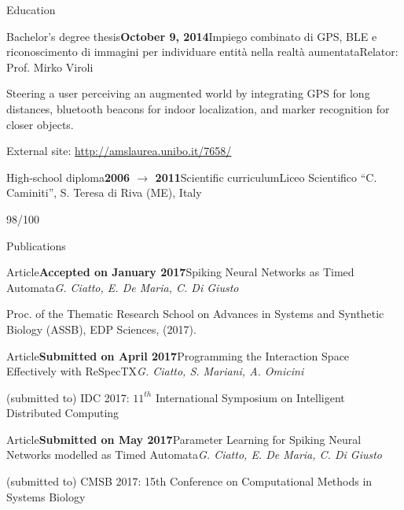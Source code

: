 \documentclass{resume} %
\begin{document}
\begin{rSection}{Education}
\begin{rSubsection}{Bachelor's degree thesis}{\textbf{October 9, 2014}}{Impiego combinato di GPS, BLE e riconoscimento di immagini per individuare entità nella realtà aumentata}{Relator: Prof. Mirko Viroli}
	
	\item Steering a user perceiving an augmented world by integrating GPS for long distances, bluetooth beacons for indoor localization, and marker recognition for closer objects.
	
	\item External site: \url{http://amslaurea.unibo.it/7658/}
\end{rSubsection}

\begin{rSubsection}{High-school diploma}{\textbf{2006 $\rightarrow$ 2011}}{Scientific curriculum}{Liceo Scientifico ``C. Caminiti'', S. Teresa di Riva (ME), Italy}
	\item 98/100
\end{rSubsection}

\end{rSection}

\clearpage


\begin{rSection}{Publications}

\begin{rSubsection}{Article}{\textbf{Accepted on January 2017}}{Spiking Neural Networks as Timed Automata}{\emph{G. Ciatto, E. De Maria, C. Di Giusto}}
	\item Proc. of the Thematic Research School on Advances in Systems and Synthetic Biology (ASSB), EDP Sciences, (2017).
\end{rSubsection}

\begin{rSubsection}{Article}{\textbf{Submitted on April 2017}}{Programming the Interaction Space
		Effectively with ReSpecTX}{\emph{G. Ciatto, S. Mariani, A. Omicini}}
	\item (submitted to) IDC 2017: $11^{th}$ International Symposium on Intelligent Distributed Computing
\end{rSubsection}

\begin{rSubsection}{Article}{\textbf{Submitted on May 2017}}{Parameter Learning for Spiking Neural Networks modelled as Timed Automata}{\emph{G. Ciatto, E. De Maria, C. Di Giusto}}
	\item (submitted to) CMSB 2017: 15th Conference on Computational Methods in Systems Biology
\end{rSubsection}

\end{rSection}
\end{document}
